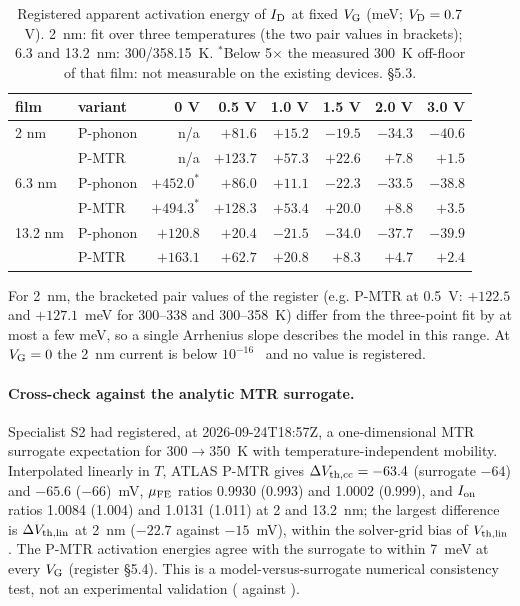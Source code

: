 \begin{table}[tbp]
  \centering
  \small
  \caption{Registered apparent activation energy of $I_{\mathrm{D}}$ at fixed $V_{\mathrm{G}}$ (meV; $V_{\mathrm{D}} = 0.7$~V). 2~nm: fit over three temperatures (the two pair values in brackets); 6.3 and 13.2~nm: 300/358.15~K. $^{*}$Below 5$\times$ the measured 300~K off-floor of that film: not measurable on the existing devices.  \S 5.3.}
  \label{tab:pred-ea}
  \begin{tabular}{llrrrrrr}
    \toprule
    film & variant & 0 V & 0.5 V & 1.0 V & 1.5 V & 2.0 V & 3.0 V \\
    \midrule
    2 nm & P-phonon & n/a & $+81.6$ & $+15.2$ & $-19.5$ & $-34.3$ & $-40.6$ \\
         & P-MTR    & n/a & $+123.7$ & $+57.3$ & $+22.6$ & $+7.8$ & $+1.5$ \\
    6.3 nm & P-phonon & $+452.0^{*}$ & $+86.0$ & $+11.1$ & $-22.3$ & $-33.5$ & $-38.8$ \\
         & P-MTR    & $+494.3^{*}$ & $+128.3$ & $+53.4$ & $+20.0$ & $+8.8$ & $+3.5$ \\
    13.2 nm & P-phonon & $+120.8$ & $+20.4$ & $-21.5$ & $-34.0$ & $-37.7$ & $-39.9$ \\
         & P-MTR    & $+163.1$ & $+62.7$ & $+20.8$ & $+8.3$ & $+4.7$ & $+2.4$ \\
    \bottomrule
  \end{tabular}
\end{table}

For 2~nm, the bracketed pair values of the register (e.g. P-MTR at 0.5~V: $+122.5$ and $+127.1$~meV for 300--338 and 300--358~K) differ from the three-point fit by at most a few meV, so a single Arrhenius slope describes the model in this range. At $V_{\mathrm{G}} = 0$ the 2~nm current is below $10^{-16}$~\Aum{} and no value is registered.

\paragraph{Cross-check against the analytic MTR surrogate.} Specialist S2 had registered, at 2026-09-24T18:57Z, a one-dimensional MTR surrogate expectation for 300$\rightarrow$350~K with temperature-independent mobility. Interpolated linearly in $T$, ATLAS P-MTR gives $\Delta V_{\mathrm{th,cc}} = -63.4$ (surrogate $-64$) and $-65.6$ ($-66$)~mV, $\mu_{\mathrm{FE}}$ ratios 0.9930 (0.993) and 1.0002 (0.999), and $I_{\mathrm{on}}$ ratios 1.0084 (1.004) and 1.0131 (1.011) at 2 and 13.2~nm; the largest difference is $\Delta V_{\mathrm{th,lin}}$ at 2~nm ($-22.7$ against $-15$~mV), within the solver-grid bias of $V_{\mathrm{th,lin}}$. The P-MTR activation energies agree with the surrogate to within 7~meV at every $V_{\mathrm{G}}$ (register \S 5.4). This is a model-versus-surrogate numerical consistency test, not an experimental validation (\evSURR{} against \evNUM).

